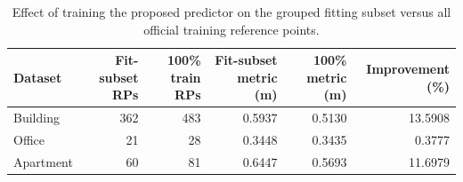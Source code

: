 \begin{table}
\caption{Effect of training the proposed predictor on the grouped fitting subset versus all official training reference points.}
\label{tab:data_utilization}
\begin{tabular}{lrrrrr}
\toprule
Dataset & Fit-subset RPs & 100\% train RPs & Fit-subset metric (m) & 100\% metric (m) & Improvement (\%) \\
\midrule
Building & 362 & 483 & 0.5937 & 0.5130 & 13.5908 \\
Office & 21 & 28 & 0.3448 & 0.3435 & 0.3777 \\
Apartment & 60 & 81 & 0.6447 & 0.5693 & 11.6979 \\
\bottomrule
\end{tabular}
\end{table}
